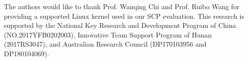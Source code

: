 \documentclass[format=acmsmall, review=false, screen=true, anonymous=false]{acmart}
\begin{document}





\begin{acks}

The authors would like to thank Prof. Wanqing Chi and Prof. Ruibo Wang
for providing a supported Linux kernel used in our SCP evaluation.
This research is supported by
the National Key Research and Development Program 
of China (NO.2017YFB0202003),
Innovative Team Support Program of Hunan (2017RS3047),
and Australian Research Council (DP170103956 and DP180104069).


\end{acks}



\end{document}
